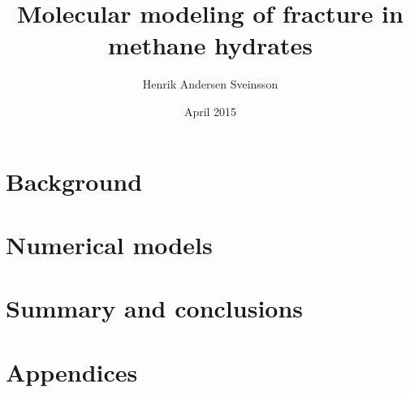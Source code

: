 \documentclass[twoside, english, a4paper, 11pt]{uiofysmaster}
\title{Molecular modeling of fracture in methane hydrates}
\author{Henrik Andersen Sveinsson}
\date{April 2015}
\begin{document}
\maketitle

\setlength{\parindent}{0em}
\setlength{\parskip}{1em}




\setlength{\parskip}{0em}
\tableofcontents
\setlength{\parindent}{2em}

\setcounter{page}{11}




\part{Background}






\part{Numerical models}





\part{Summary and conclusions}


\part{Appendices}
\appendix





\end{document}
